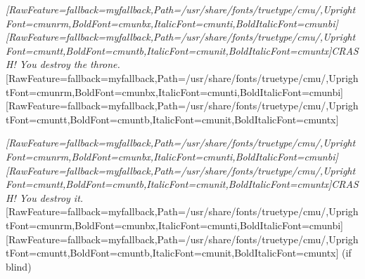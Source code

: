 \begin{myitemize}\item{}{\itshape \allowbreak{}\setmainfont{cmunti.ttf}[RawFeature={fallback=myfallback},Path=/usr/share/fonts/truetype/cmu/,UprightFont=cmunrm,BoldFont=cmunbx,ItalicFont=cmunti,BoldItalicFont=cmunbi]\setmonofont{cmunti.ttf}[RawFeature={fallback=myfallback},Path=/usr/share/fonts/truetype/cmu/,UprightFont=cmuntt,BoldFont=cmuntb,ItalicFont=cmunit,BoldItalicFont=cmuntx]\itshape {}CRASH! You destroy the throne.}\allowbreak{}\setmainfont{cmunrm.ttf}[RawFeature={fallback=myfallback},Path=/usr/share/fonts/truetype/cmu/,UprightFont=cmunrm,BoldFont=cmunbx,ItalicFont=cmunti,BoldItalicFont=cmunbi]\setmonofont{cmunrm.ttf}[RawFeature={fallback=myfallback},Path=/usr/share/fonts/truetype/cmu/,UprightFont=cmuntt,BoldFont=cmuntb,ItalicFont=cmunit,BoldItalicFont=cmuntx]
\item{}{\itshape \allowbreak{}\setmainfont{cmunti.ttf}[RawFeature={fallback=myfallback},Path=/usr/share/fonts/truetype/cmu/,UprightFont=cmunrm,BoldFont=cmunbx,ItalicFont=cmunti,BoldItalicFont=cmunbi]\setmonofont{cmunti.ttf}[RawFeature={fallback=myfallback},Path=/usr/share/fonts/truetype/cmu/,UprightFont=cmuntt,BoldFont=cmuntb,ItalicFont=cmunit,BoldItalicFont=cmuntx]\itshape {}CRASH! You destroy it.}{$\text{ }$}\allowbreak{}\setmainfont{cmunrm.ttf}[RawFeature={fallback=myfallback},Path=/usr/share/fonts/truetype/cmu/,UprightFont=cmunrm,BoldFont=cmunbx,ItalicFont=cmunti,BoldItalicFont=cmunbi]\setmonofont{cmunrm.ttf}[RawFeature={fallback=myfallback},Path=/usr/share/fonts/truetype/cmu/,UprightFont=cmuntt,BoldFont=cmuntb,ItalicFont=cmunit,BoldItalicFont=cmuntx] (if blind)
\end{myitemize}

